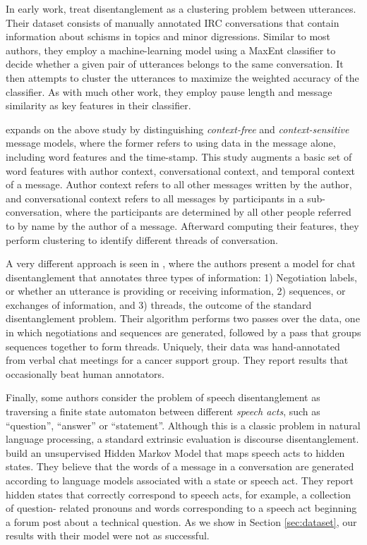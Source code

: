 \documentclass{article}
\begin{document}
In early work,  treat disentanglement as a clustering
problem between utterances. Their dataset consists of manually annotated IRC
conversations that contain information about schisms in topics and minor
digressions. Similar to most authors, they employ a machine-learning model
using a MaxEnt classifier to decide whether a given pair of utterances belongs
to the same conversation. It then attempts to cluster the utterances to
maximize the weighted accuracy of the classifier. As with much other work,
they employ pause length and message similarity as key features in their
classifier.

 expands on the above study by distinguishing
\textit{context-free} and \textit{context-sensitive} message models, where the 
former refers to using data in the message alone, including word features and the
time-stamp.  This study augments a basic set of word features with author context, 
conversational context, and temporal context of a message. Author context 
refers to all other messages written by the author, and conversational context 
refers to all messages by participants in a sub-conversation, 
where the participants are determined by all other people referred to by name 
by the author of a message.  Afterward computing their features, they perform
clustering to identify different threads of conversation.

A very different approach is seen in , where the
authors present a model for chat disentanglement that annotates three types of
information: 1) Negotiation labels, or whether an utterance is providing or
receiving information, 2) sequences, or exchanges of information, and 3)
threads, the outcome of the standard disentanglement problem. Their algorithm
performs two passes over the data,  one in which negotiations and sequences
are generated, followed by a pass that groups sequences together to form
threads. Uniquely, their data was hand-annotated from verbal chat meetings for
a cancer support group. They report results that occasionally beat human
annotators.

Finally, some authors consider the problem of speech disentanglement as
traversing a finite state automaton between different \textit{speech acts},
such as ``question'', ``answer'' or ``statement''. Although this is a classic
problem in natural language processing, a standard extrinsic evaluation is
discourse disentanglement.  build an unsupervised
Hidden Markov Model that  maps speech acts to hidden states. They believe that
the words of a message in a conversation are generated according to language
models associated with a state or speech act. They report hidden states that
correctly correspond to speech acts, for example, a collection of question-
related pronouns and words corresponding to a speech act beginning a forum
post about a technical question. As we show in Section \ref{sec:dataset}, our
results with their model were not as successful.
\end{document}
